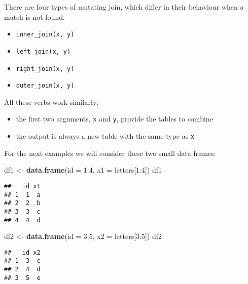 \documentclass[]{book}
\newenvironment{Shaded}{\begin{snugshade}}{\end{snugshade}}
\newcommand{\KeywordTok}[1]{\textcolor[rgb]{0.13,0.29,0.53}{\textbf{{#1}}}}
\newcommand{\DataTypeTok}[1]{\textcolor[rgb]{0.13,0.29,0.53}{{#1}}}
\newcommand{\DecValTok}[1]{\textcolor[rgb]{0.00,0.00,0.81}{{#1}}}
\newcommand{\StringTok}[1]{\textcolor[rgb]{0.31,0.60,0.02}{{#1}}}
\newcommand{\NormalTok}[1]{{#1}}
\providecommand{\tightlist}{%
  \setlength{\itemsep}{0pt}\setlength{\parskip}{0pt}}
\def\tightlist{}
\begin{document}
There are four types of mutating join, which differ in their behaviour
when a match is not found.

\begin{itemize}
\tightlist
\item
  \texttt{inner\_join(x,\ y)}
\item
  \texttt{left\_join(x,\ y)}
\item
  \texttt{right\_join(x,\ y)}
\item
  \texttt{outer\_join(x,\ y)}
\end{itemize}

All these verbs work similarly:

\begin{itemize}
\tightlist
\item
  the first two arguments, \texttt{x} and \texttt{y}, provide the tables
  to combine
\item
  the output is always a new table with the same type as \texttt{x}
\end{itemize}

For the next examples we will consider these two small data frames:

\begin{Shaded}
\begin{Highlighting}[]
\NormalTok{df1 <-}\StringTok{ }\KeywordTok{data.frame}\NormalTok{(}\DataTypeTok{id =} \DecValTok{1}\NormalTok{:}\DecValTok{4}\NormalTok{, }\DataTypeTok{x1 =} \NormalTok{letters[}\DecValTok{1}\NormalTok{:}\DecValTok{4}\NormalTok{])}
\NormalTok{df1}
\end{Highlighting}
\end{Shaded}

\begin{verbatim}
##   id x1
## 1  1  a
## 2  2  b
## 3  3  c
## 4  4  d
\end{verbatim}

\begin{Shaded}
\begin{Highlighting}[]
\NormalTok{df2 <-}\StringTok{ }\KeywordTok{data.frame}\NormalTok{(}\DataTypeTok{id =} \DecValTok{3}\NormalTok{:}\DecValTok{5}\NormalTok{, }\DataTypeTok{x2 =} \NormalTok{letters[}\DecValTok{3}\NormalTok{:}\DecValTok{5}\NormalTok{])}
\NormalTok{df2}
\end{Highlighting}
\end{Shaded}

\begin{verbatim}
##   id x2
## 1  3  c
## 2  4  d
## 3  5  e
\end{verbatim}
\end{document}
